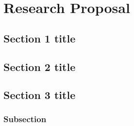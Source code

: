 \chapter{Research Proposal}

\section{Section 1 title}

\section{Section 2 title}

\section{Section 3 title}

\subsection{Subsection}